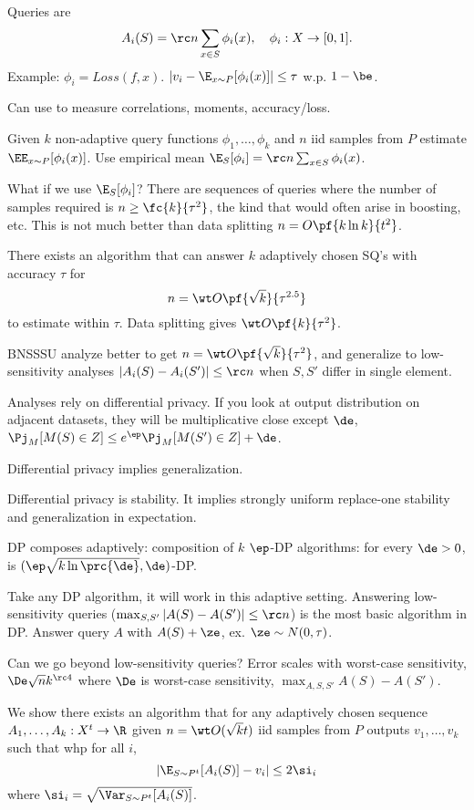 Queries are
$$
A_i(S) = \rc n \sum_{x\in S} \phi_i(x), \quad \phi_i:X\to [0,1].
$$
Example: $\phi_i=Loss(f,x)$. $|v_i-\E_{x\sim P}[\phi_i(x)]|\le \tau$ w.p. $1-\be$.

Can use to measure correlations, moments, accuracy/loss.

Given $k$ non-adaptive query functions $\phi_1,\ldots, \phi_k$ and $n$ iid samples from $P$ estimate $\EE_{x\sim P}[\phi_i(x)]$. Use empirical mean $\E_S[\phi_i]=\rc n \sum_{x\in S}\phi_i(x)$. 

What if we use $\E_S[\phi_i]$? There are sequences of queries where the number of samples required is $n\ge \fc{k}{\tau^2}$, the kind that would often arise in boosting, etc. This is not much better than data splitting $n=O\pf{k\ln k}{t^2}$.

There exists an algorithm that can answer $k$ adaptively chosen SQ's with accuracy $\tau$ for 
$$
n=\wt O\pf{\sqrt k}{\tau^{2.5}}
$$
to estimate within $\tau$.
Data splitting gives $\wt O\pf{k}{\tau^2}$. 

BNSSSU analyze better to get $n=\wt O\pf{\sqrt k}{\tau^2}$, and generalize to low-sensitivity analyses $|A_i(S)-A_i(S')|\le \rc n$  when $S,S'$ differ in single element.

Analyses rely on differential privacy. If you look at output distribution on adjacent datasets, they will be multiplicative close except $\de$, $\Pj_M[M(S)\in Z] \le e^\ep \Pj_{M}[M(S')\in Z]+\de$.

Differential privacy implies generalization.

Differential privacy is stability. It implies strongly uniform replace-one stability and generalization in expectation.

DP composes adaptively: composition of $k$ $\ep$-DP algorithms: for every $\de>0$, is $(\ep\sqrt{k\ln \prc{\de}}, \de)$-DP. 

Take any DP algorithm, it will work in this adaptive setting. Answering low-sensitivity queries ($\max_{S,S'}|A(S)-A(S')|\le \rc n$) is the most basic algorithm in DP. Answer query $A$ with $A(S)+\ze$, ex. $\ze\sim N(0,\tau)$. 

Can we go beyond low-sensitivity queries? %
Error scales with worst-case sensitivity, $\De \sqrt n k^{\rc 4}$ where $\De$ is worst-case sensitivity, $\max_{A,S,S'} A(S)-A(S')$.

We show there exists an algorithm that for any adaptively chosen sequence $A_1,\ldots, A_k:X^t\to \R$ given $n=\wt O(\sqrt k t)$ iid samples from $P$ outputs $v_1,\ldots, v_k$ such that whp for all $i$,
$$
|\E_{S\sim P^t}[A_i(S)] - v_i|\le 2\si_i
$$
where $\si_i=\sqrt{\Var_{S\sim P^t} [A_i(S)]}$. 

